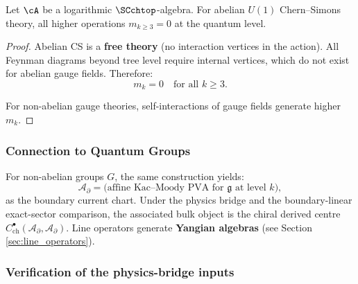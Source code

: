 \begin{proposition}
Let\/ $\cA$ be a logarithmic\/ $\SCchtop$-algebra.
For abelian $U(1)$ Chern--Simons theory, all higher operations $m_{k \geq 3} = 0$ at the quantum level.
\end{proposition}

\begin{proof}
Abelian CS is a \textbf{free theory} (no interaction vertices in the action). All Feynman diagrams beyond tree level require internal vertices, which do not exist for abelian gauge fields. Therefore:
\begin{equation}
m_k = 0 \quad \text{for all } k \geq 3.
\end{equation}

For non-abelian gauge theories, self-interactions of gauge fields generate higher $m_k$.
\end{proof}

\subsubsection{Connection to Quantum Groups}

For non-abelian groups $G$, the same construction yields:
\begin{equation}
\mathcal{A}_{\partial} = \text{(affine Kac--Moody PVA for $\mathfrak{g}$ at level $k$)},
\end{equation}
as the boundary current chart.  Under the physics bridge and the
boundary-linear exact-sector comparison, the associated bulk object is
the chiral derived centre
$C^\bullet_{\mathrm{ch}}(\mathcal{A}_{\partial},\mathcal{A}_{\partial})$.
Line operators generate \textbf{Yangian algebras}
(see Section \ref{sec:line_operators}).


\subsubsection{Verification of the physics-bridge inputs}

